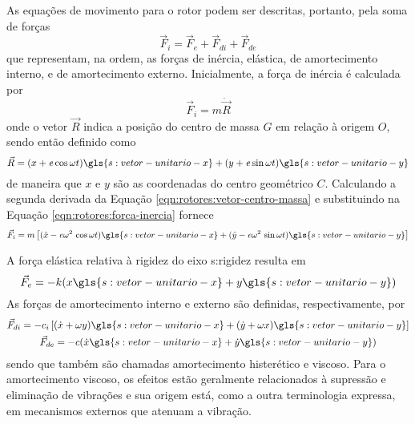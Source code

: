 \documentclass[12pt,openright,oneside,a4paper,
	chapter=TITLE,section=TITLE,
	english,brazil]{abntex2}
\begin{document}
	As equações de movimento para o rotor podem ser descritas, portanto, pela soma de forças \cite{rao:2008}
	\begin{equation} \label{eqn:rotores:forcas}
		\vec{F}_i = \vec{F}_e + \vec{F}_{di} + \vec{F}_{de}
	\end{equation}
	que representam, na ordem, as forças de inércia, elástica, de amortecimento interno, e de amortecimento externo. Inicialmente, a força de inércia é calculada por \cite{rao:2008}
	\begin{equation} \label{eqn:rotores:forca-inercia}
		\vec{F}_i = m\ddot{\vec{R}}
	\end{equation}
	onde o vetor $ \vec{R} $ indica a posição do centro de massa $ \mathit{G} $ em relação à origem $ \mathit{O} $, sendo então definido como \cite{rao:2008}
	\begin{equation} \label{eqn:rotores:vetor-centro-massa}
		\vec{R} = (x + \mathit{e}\cos\omega t)\gls{s:vetor-unitario-x} + (y + \mathit{e}\sin\omega t)\gls{s:vetor-unitario-y}
	\end{equation}
	de maneira que $ x $ e $ y $ são as coordenadas do centro geométrico $ \mathit{C} $. Calculando a segunda derivada da Equação \ref{eqn:rotores:vetor-centro-massa} e substituindo na Equação \ref{eqn:rotores:forca-inercia} fornece
	\begin{equation} \label{eqn:rotres:forca-inercia}
		\vec{F}_i = m\left[ (\ddot{x} - \mathit{e}\omega^2\,\cos\omega t)\gls{s:vetor-unitario-x} +
		(\ddot{y} - \mathit{e}\omega^2\,\sin\omega t)\gls{s:vetor-unitario-y} \right]
	\end{equation}
	
	A força elástica relativa à rigidez do eixo \gls{s:rigidez} resulta em \cite{rao:2008}
	\begin{equation}\label{eqn:rotores:forca-elastica}
		\vec{F}_e = -k(x\gls{s:vetor-unitario-x} + y\gls{s:vetor-unitario-y})
	\end{equation}
	As forças de amortecimento interno e externo são definidas, respectivamente, por \cite{rao:2008}
	\begin{gather}
		\vec{F}_{di} = -c_i\left[(\dot{x} + \omega y)\gls{s:vetor-unitario-x} +
		(\dot{y} + \omega x)\gls{s:vetor-unitario-y} \right] \label{eqn:rotores:forca-amort-interno} \\
		\vec{F}_{de} = -c(\dot{x}\gls{s:vetor-unitario-x} + \dot{y}\gls{s:vetor-unitario-y}) \label{eqn:rotores:forca-amort-externo}
	\end{gather}
	sendo que também são chamadas amortecimento histerético e viscoso. Para o amortecimento viscoso, os efeitos estão geralmente relacionados à supressão e eliminação de vibrações \cite{dimarogonas:1995} e sua origem está, como a outra terminologia expressa, em mecanismos externos que atenuam a vibração.
	
\end{document}
